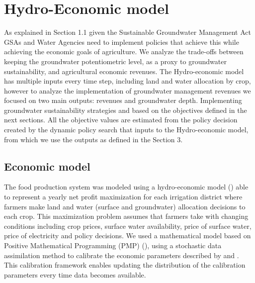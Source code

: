 \documentclass[11pt,a4paper]{article}
\begin{document}
\section{Hydro-Economic model}

As explained in Section 1.1 given the Sustainable Groundwater Management Act GSAs and Water Agencies need to implement policies that achieve this while achieving the economic goals of agriculture. We analyze the trade-offs between keeping the groundwater potentiometric level, as a proxy to groundwater sustainability, and agricultural economic revenues. The Hydro-economic model has multiple inputs every time step, including land and water allocation by crop, however to analyze the implementation of groundwater management revenues we focused on two main outputs: revenues and groundwater depth. Implementing groundwater sustainability strategies and based on the objectives defined in the next sections. All the objective values are estimated from the policy decision created by the dynamic policy search that inputs to the Hydro-economic model, from which we use the outputs as defined in the Section 3.

\subsection{Economic model}

The food production system was modeled using a hydro-economic model (\cite{harou_hydro-economic_2009}) able to represent a yearly net profit maximization for each irrigation district where farmers make land and water (surface and groundwater) allocation decisions to each crop. This maximization problem assumes that farmers take with changing conditions including crop prices, surface water availability, price of surface water, price of electricity and policy decisions. We used a mathematical model based on Positive Mathematical Programming (PMP) (\cite{howitt_calibration_1995}), using a stochastic data assimilation method to calibrate the economic parameters described by \textcite{maneta_stochastic_2014} and \textcite{maneta_satellite-driven_2020}. This calibration framework enables updating the distribution of the calibration parameters every time data becomes available. 
\end{document}
